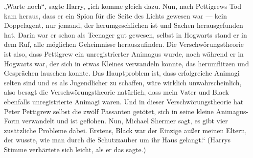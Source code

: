 „Warte noch“, sagte Harry, „ich komme gleich dazu. Nun, nach Pettigrews Tod kam heraus, dass er ein Spion für die Seite des Lichts gewesen war — kein Doppelagent, nur jemand, der herumgeschlichen ist und Sachen herausgefunden hat. Darin war er schon als Teenager gut gewesen, selbst in Hogwarts stand er in dem Ruf, alle möglichen Geheimnisse herauszufinden. Die Verschwörungstheorie ist also, dass Pettigrew ein unregistrierter Animagus wurde, noch während er in Hogwarts war, der sich in etwas Kleines verwandeln konnte, das herumflitzen und Gesprächen lauschen konnte. Das Hauptproblem ist, dass erfolgreiche Animagi selten sind und es als Jugendlicher zu schaffen, wäre wirklich unwahrscheinlich, also besagt die Verschwörungstheorie natürlich, dass mein Vater und Black ebenfalls unregistrierte Animagi waren. Und in dieser Verschwörungstheorie hat Peter Pettigrew selbst die zwölf Passanten getötet, sich in seine kleine Animagus-Form verwandelt und ist geflohen. Nun, Michael Shermer sagt, es gibt vier zusätzliche Probleme dabei. Erstens, Black war der Einzige außer meinen Eltern, der wusste, wie man durch die Schutzzauber um ihr Haus gelangt.“ (Harrys Stimme verhärtete sich leicht, als er das sagte.)
